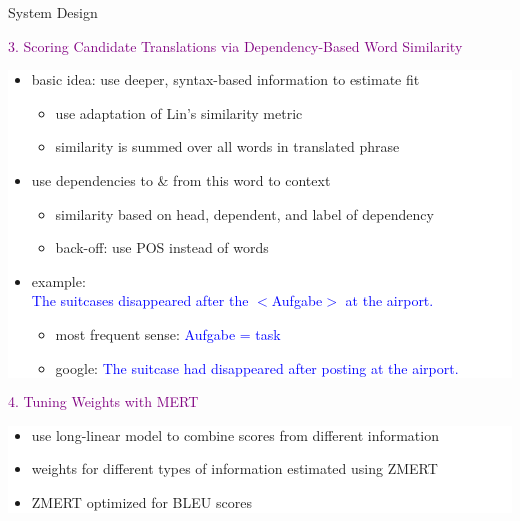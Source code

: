 \documentclass[final,t]{beamer}
\begin{document}
\begin{frame}{}
\begin{columns}[t]
\begin{column}{.47\linewidth}
\begin{block}{System Design}


\begin{center}
  \textcolor{purple}{3. Scoring Candidate Translations via Dependency-Based Word Similarity}
\end{center}

  \colorbox{white}{
\begin{minipage}{.90\linewidth}
  \begin{itemize}
  \item basic idea: use deeper, syntax-based information to estimate fit
    \begin{itemize}
    \item use adaptation of Lin's similarity metric
    \item similarity is summed over all words in translated phrase
    \end{itemize}
  \item use dependencies to \& from this word to context
    \begin{itemize}
    \item similarity based on head, dependent, and label of dependency 
    \item back-off: use POS instead of words
    \end{itemize}
  \item example: \\
    \textcolor{blue}{The suitcases disappeared after the $<$Aufgabe$>$ at the airport.}
    \begin{itemize}
    \item most frequent sense: \textcolor{blue}{Aufgabe = task}\\
    \item google: \textcolor{blue}{The suitcase had disappeared after posting at the airport.}
    \end{itemize}      
  \end{itemize}
\end{minipage}
}
\vspace{1cm}

\begin{center}
  \textcolor{purple}{4. Tuning Weights with MERT}
\end{center}

  \colorbox{white}{
\begin{minipage}{.90\linewidth}
  \begin{itemize}
  \item use long-linear model to combine scores from different information
  \item weights for different types of information estimated using ZMERT
  \item ZMERT optimized for BLEU scores
  \end{itemize}
\end{minipage}
}


\end{block}
\end{column}
\end{columns}
\end{frame}
\end{document}
